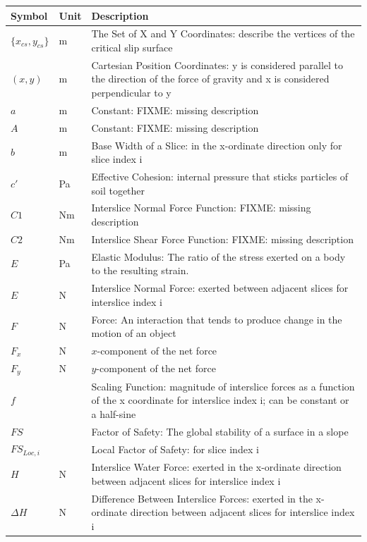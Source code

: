 \documentclass[12pt]{article}
\renewcommand{\arraystretch}{1}
\begin{document}
\renewcommand{\arraystretch}{1.6}
\setlength{\tabcolsep}{20pt}
\begin{longtable}{  l  l  p{8.5cm}  }
\hline
\textbf{Symbol} & \textbf{Unit} & \textbf{Description} \\
\hline
$\{{x_{cs}}{,y_{cs}}\}$ & \si{\meter}& The Set of X and Y Coordinates: describe the vertices of the critical slip surface 
\\
$(x,y)$ & \si{\meter}& Cartesian Position Coordinates: y is considered parallel to the direction of the force of gravity and x is considered perpendicular to y
\\
$a$ & \si{\meter}& Constant: FIXME: missing description
\\
$A$ & \si{\meter}& Constant: FIXME: missing description
\\
$b$ & \si{\meter}& Base Width of a Slice: in the x-ordinate direction only for slice index i
\\
$c'$ & \si{\pascal} & Effective Cohesion: internal pressure that sticks particles of soil together 
\\
$C1$ &  N\si{\meter}&Interslice Normal Force Function: FIXME: missing description 
\\
$C2$ &  N\si{\meter}&Interslice Shear Force Function: FIXME: missing description
\\
$E$ & \si{\pascal} & Elastic Modulus: The ratio of the stress exerted on a body to the resulting strain.
\\
$E$ & \si{\newton} & Interslice Normal Force: exerted between adjacent slices for interslice index i
\\
$F$ &\si{\newton} & Force: An interaction that tends to produce change in the motion of an object 
\\
${F_{x}}$ & \si{\newton} &$x$-component of the net force
\\
${F_{y}}$ & \si{\newton} &$y$-component of the net force
\\
$f$ & & Scaling Function: magnitude of interslice forces as a function of the x coordinate for interslice index i; can be constant or a half-sine
\\
$FS$ & &Factor of Safety: The global stability of a surface in a slope  
\\
${FS_{Loc,i}}$ & & Local Factor of Safety: for slice index i  
\\
$H$ & \si{\newton} &Interslice Water Force: exerted in the x-ordinate direction between adjacent slices for interslice index i
\\
$\Delta{}H$ & \si{\newton} & Difference Between Interslice Forces: exerted in the x-ordinate direction between adjacent slices for interslice index i

\end{longtable}
\end{document}
